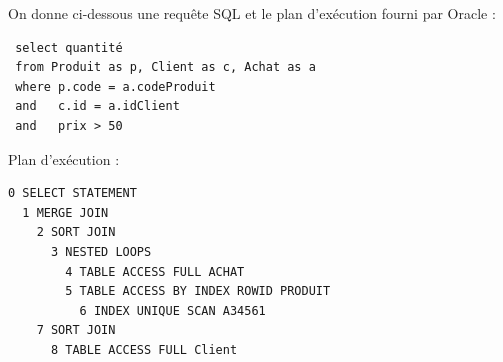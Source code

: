 On donne ci-dessous une requête SQL et le plan d'exécution fourni par Oracle :

\begin{verbatim}
 select quantité
 from Produit as p, Client as c, Achat as a
 where p.code = a.codeProduit
 and   c.id = a.idClient
 and   prix > 50
\end{verbatim}

Plan d'exécution :


\begin{verbatim}
0 SELECT STATEMENT
  1 MERGE JOIN
    2 SORT JOIN
      3 NESTED LOOPS
        4 TABLE ACCESS FULL ACHAT
        5 TABLE ACCESS BY INDEX ROWID PRODUIT
          6 INDEX UNIQUE SCAN A34561
    7 SORT JOIN
      8 TABLE ACCESS FULL Client
\end{verbatim}

